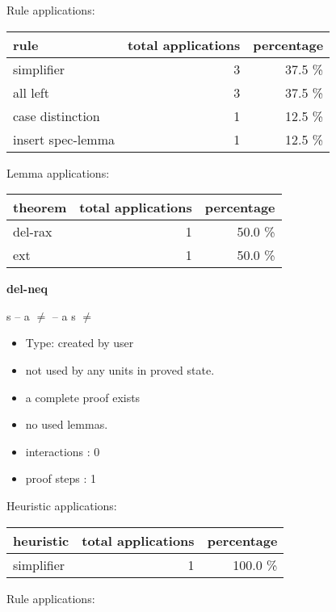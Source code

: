 \documentclass[a4paper]{article}
\begin{document}
Rule applications:

\begin{supertabular}{l|r|r}
rule	        & total applications & percentage \\ \hline
simplifier & 3 & 37.5 \% \\
all left & 3 & 37.5 \% \\
case distinction & 1 & 12.5 \% \\
insert spec-lemma & 1 & 12.5 \% \\

\end{supertabular}

Lemma applications:

\begin{supertabular}{l|r|r}
theorem	        & total applications & percentage \\ \hline
del-rax & 1 & 50.0 \% \\
ext & 1 & 50.0 \% \\

\end{supertabular}
\pagebreak

{\LARGE\bf del-neq}\label{lemma-del-neq}

\medskip

 \Fol s -- a $\neq$  -- a \Imp s $\neq$ 

\begin{itemize}

\item Type: created by user

\item not used by any units in proved state.
\item       a complete proof exists
\item       no used lemmas.
\item       interactions : 0
\item       proof steps  : 1
\end{itemize}

\medskip


Heuristic applications:

\begin{supertabular}{l|r|r}
heuristic	& total applications & percentage \\ \hline
simplifier & 1 & 100.0 \% \\

\end{supertabular}

Rule applications:
\end{document}
